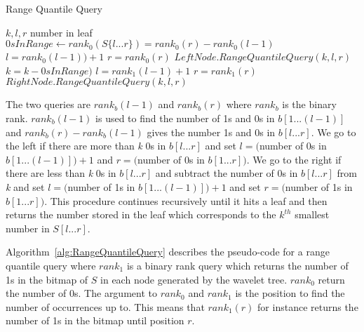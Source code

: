 \begin{algorithm}
\caption{Range Quantile Query}
\label{alg:RangeQuantileQuery}
\begin{algorithmic}
 {$k,l,r$}
	\State \Return number in leaf
\EndIf
\State $\textit{0}sInRange \gets rank_0(S \lbrace l...r \rbrace) = rank_0(r) - rank_0(l-1)$
	\State $l = rank_0(l-1))+1$
	\State $r = rank_0(r)$
	\State \Return $LeftNode.RangeQuantileQuery(k,l,r)$
\Else
	\State $k = k - \textit{0}sInRange)$
	\State $l = rank_1(l-1)+1$
	\State $r = rank_1(r)$
	\State \Return $RightNode.RangeQuantileQuery(k,l,r)$
\EndIf

\EndFunction
\end{algorithmic}
\end{algorithm}

The two queries are $rank_b(l-1)$ and $rank_b(r)$ where $rank_b$ is the binary rank.
$rank_b(l-1)$ is used to find the number of 1s and 0s in $b[1...(l-1)]$ and $rank_b(r) - rank_b(l-1)$ gives the number 1s and 0s in $b[l...r]$. 
We go to the left if there are more than \textit{k} 0s in $b[l...r]$ and set $l = ($number of 0s in $b[1...(l-1)])+1$ and $r=($number of 0s in $b[1...r])$. 
We go to the right if there are less than \textit{k} 0s in $b[l...r]$ and subtract the number of 0s in $b[l...r]$ from \textit{k} and set $l = ($number of 1s in $b[1...(l-1)])+1$ and set $r=($number of 1s in $b[1...r])$. 
This procedure continues recursively until it hits a leaf and then returns the number stored in the leaf which corresponds to the $k^{th}$ smallest number in $S[l...r]$.

Algorithm~\ref{alg:RangeQuantileQuery} describes the pseudo-code for a range quantile query where $rank_1$ is a binary rank query which returns the number of 1s in the bitmap of $S$ in each node generated by the wavelet tree. 
$rank_0$ return the number of 0s.
The argument to $rank_0$ and $rank_1$ is the position to find the number of occurrences up to.
This means that $rank_1(r)$ for instance returns the number of 1s in the bitmap until position $r$.

